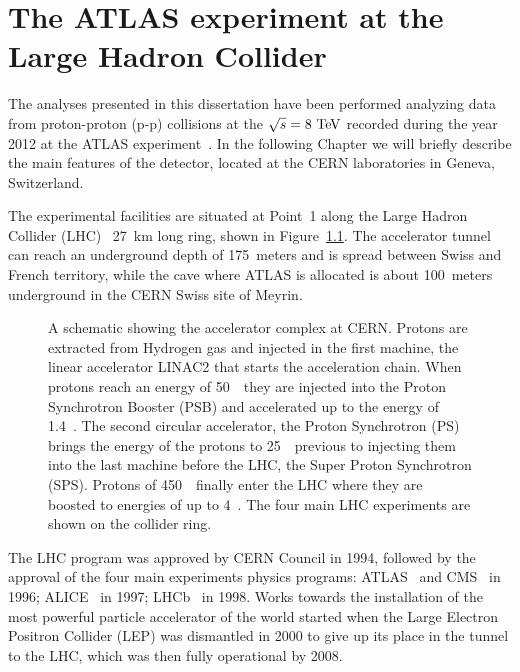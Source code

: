 \clearpage{\pagestyle{empty}\cleardoublepage}

\chapter{The ATLAS experiment at the Large Hadron Collider}\label{chap:atlas}

The analyses presented in this dissertation have been performed analyzing data from 
proton-proton (p-p) collisions at the \cme $\rts=8\tev$ recorded during the year 2012 
at the ATLAS experiment~\cite{Aad:2008zzm}. In the following Chapter we will briefly 
describe the main features of the detector, located at the CERN laboratories in Geneva,
Switzerland.

The experimental facilities are situated at Point~1 along the Large Hadron Collider 
(LHC)~\cite{lhc} 27~km long ring, shown in Figure~\ref{fig:lhcring}. The accelerator
tunnel can reach an underground depth of 175~meters and is spread between Swiss
and French territory, while the cave where ATLAS is allocated is about 100~meters 
underground in the CERN Swiss site of Meyrin. 

\begin{figure}[tb]\begin{center}
	\caption{A schematic showing the accelerator complex at CERN. Protons are
        extracted from Hydrogen gas and injected in the first machine, the linear 
        accelerator LINAC2 that starts the acceleration chain. When protons reach
        an energy of 50~\mev\ they are injected into the Proton Synchrotron Booster
        (PSB) and accelerated up to the energy of 1.4~\gev. The second circular
        accelerator, the Proton Synchrotron (PS) brings the energy of the protons
        to 25~\gev\ previous to injecting them into the last machine before the LHC,
        the Super Proton Synchrotron (SPS). Protons of 450~\gev\ finally enter the
        LHC where they are boosted to energies of up to 4~\tev.
        The four main LHC experiments are shown on the collider ring.\label{fig:lhcring}}
\end{center}\end{figure}

The LHC program was approved by CERN Council in 1994, followed by the approval of
the four main experiments physics programs: ATLAS~\cite{Aad:2008zzm} and CMS~\cite{cms}
in 1996; ALICE~\cite{alice} in 1997; LHCb~\cite{lhcb} in 1998.
Works towards the installation of the most powerful particle accelerator of the world
started when the Large Electron Positron Collider (LEP) was dismantled in 2000 to 
give up its place in the tunnel to the LHC, which was then fully operational by 2008.


